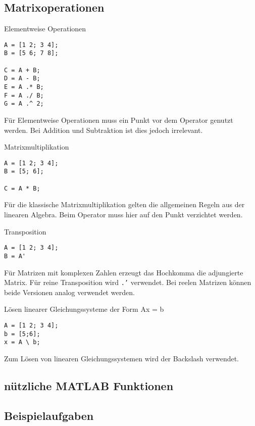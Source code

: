         \subsection{Matrixoperationen}
        \begin{CodeErklaerungBox}{Elementweise Operationen}
                \begin{lstlisting}
A = [1 2; 3 4];
B = [5 6; 7 8];

C = A + B;
D = A - B;
E = A .* B;
F = A ./ B;
G = A .^ 2;
                \end{lstlisting}
                \tcblower
                Für Elementweise Operationen muss ein Punkt vor dem Operator genutzt werden. Bei Addition und Subtraktion ist dies jedoch irrelevant.
            \end{CodeErklaerungBox}
            \begin{CodeErklaerungBox}{Matrixmultiplikation}
                \begin{lstlisting}
A = [1 2; 3 4];
B = [5; 6];

C = A * B;
                \end{lstlisting}
                \tcblower
                Für die klassische Matrixmultiplikation gelten die allgemeinen Regeln aus der linearen Algebra. Beim Operator muss hier auf den Punkt verzichtet werden.
            \end{CodeErklaerungBox}
            \begin{CodeErklaerungBox}{Transposition}
                \begin{lstlisting}
A = [1 2; 3 4];
B = A'
                \end{lstlisting}
                \tcblower
                Für Matrizen mit komplexen Zahlen erzeugt das Hochkomma die adjungierte Matrix. Für reine Transposition wird \texttt{.'} verwendet. Bei reelen Matrizen können beide Versionen analog verwendet werden.
            \end{CodeErklaerungBox}
            \begin{CodeErklaerungBox}{Lösen linearer Gleichungssysteme der Form {Ax = b}}
                \begin{lstlisting}
A = [1 2; 3 4];
b = [5;6];
x = A \ b;
                \end{lstlisting}
                \tcblower
                Zum Lösen von linearen Gleichungssystemen wird der Backslash verwendet.
            \end{CodeErklaerungBox}
        \subsection{nützliche MATLAB Funktionen}
        \subsection{Beispielaufgaben}